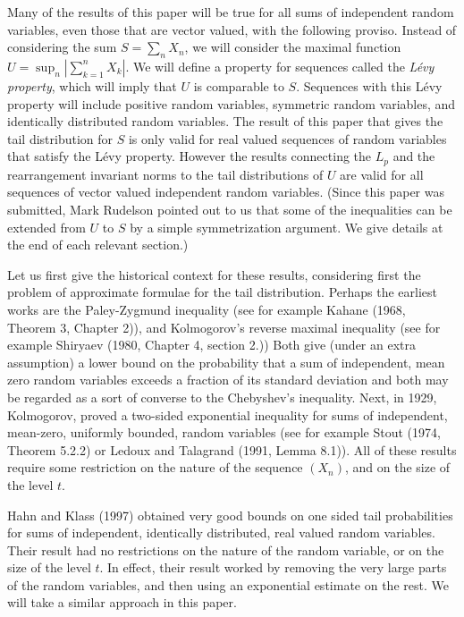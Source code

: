 \documentclass[12pt]{article}
\newcommand{\modo}[1]{{\left|#1\right|}}
\begin{document}
Many of the results of this paper will be true for all sums of
independent random variables, even those that are vector valued, with
the following proviso.  Instead of considering 
the sum $S = \sum_n X_n$, we will
consider the maximal function $U = \sup_n \modo{\sum_{k=1}^n X_k}$.  
We will define a property for sequences called the {\em L\'evy property},
which will imply that $U$ is comparable to $S$.  Sequences
with this L\'evy property will include positive random
variables, symmetric random variables, and identically distributed
random variables. The result of this paper that gives the tail
distribution for $S$ is only valid for real valued sequences of
random variables that satisfy the L\'evy property.  However the results
connecting the $L_p$ and the rearrangement invariant norms to the
tail distributions of $U$ are valid for
all sequences of vector valued independent random variables.
(Since this paper was submitted, Mark Rudelson pointed out to us
that some of the inequalities can be extended from $U$ to $S$ by a
simple symmetrization argument.  We give details at the end of each
relevant section.)

Let us first give the historical context for these results, considering
first the problem of approximate formulae for the tail distribution.
Perhaps the earliest works are the
Paley-Zygmund inequality (see for example Kahane (1968, Theorem 3, Chapter 2)), 
and Kolmogorov's reverse maximal inequality (see for example Shiryaev (1980,
Chapter 4, 
section 2.)) Both give (under an extra assumption) a lower bound on the
probability that a sum of independent, mean zero random variables
exceeds a 
fraction of its standard deviation and both may be regarded as a sort
of 
converse to the Chebyshev's inequality.
Next, in 1929, Kolmogorov, proved a
two-sided exponential inequality for sums of independent, mean-zero, 
uniformly bounded, random variables (see for example Stout
(1974, 
Theorem 5.2.2) or Ledoux and Talagrand (1991, Lemma 8.1)).
All of these results require some restriction on the nature
of the sequence $(X_n)$, and on the size of the level $t$.

Hahn and Klass (1997)
obtained very good bounds on one sided tail probabilities for sums
of independent, identically distributed, real valued 
random variables.  Their
result had no restrictions on the nature of the random variable, or
on the size of the level $t$.
In effect, their
result worked by removing the very large parts of the random variables,
and then using an exponential estimate on the rest.  
We will take a similar approach in this paper.
\end{document}
